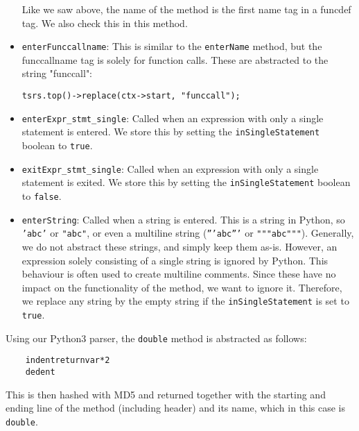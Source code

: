 \documentclass[../Main.tex]{subfiles}
\begin{document}
\begin{itemize}
    Like we saw above, the name of the method is the first name tag in a funcdef tag. We also check this in this method.
    \item \texttt{enterFunccallname}: This is similar to the \texttt{enterName} method, but the funccallname tag is solely for function calls. These are abstracted to the string "funccall":
    \begin{lstlisting}
tsrs.top()->replace(ctx->start, "funccall");
    \end{lstlisting}
    \item \texttt{enterExpr\_stmt\_single}: Called when an expression with only a single statement is entered. We store this by setting the \texttt{inSingleStatement} boolean to \texttt{true}.
    \item \texttt{exitExpr\_stmt\_single}: Called when an expression with only a single statement is exited. We store this by setting the \texttt{inSingleStatement} boolean to \texttt{false}.
    \item \texttt{enterString}: Called when a string is entered. This is a string in Python, so \texttt{'abc'} or \texttt{"abc"}, or even a multiline string (\texttt{'''abc'''} or \texttt{"""abc"""}). Generally, we do not abstract these strings, and simply keep them as-is. However, an expression solely consisting of a single string is ignored by Python. This behaviour is often used to create multiline comments. Since these have no impact on the functionality of the method, we want to ignore it. Therefore, we replace any string by the empty string if the \texttt{inSingleStatement} is set to \texttt{true}.
\end{itemize}


Using our Python3 parser, the \texttt{double} method is abstracted as follows:\\
\begin{lstlisting}
    indentreturnvar*2
    dedent
\end{lstlisting}
\vspace{15pt}
This is then hashed with MD5 and returned together with the starting and ending line of the method (including header) and its name, which in this case is \texttt{double}.\\
\end{document}
